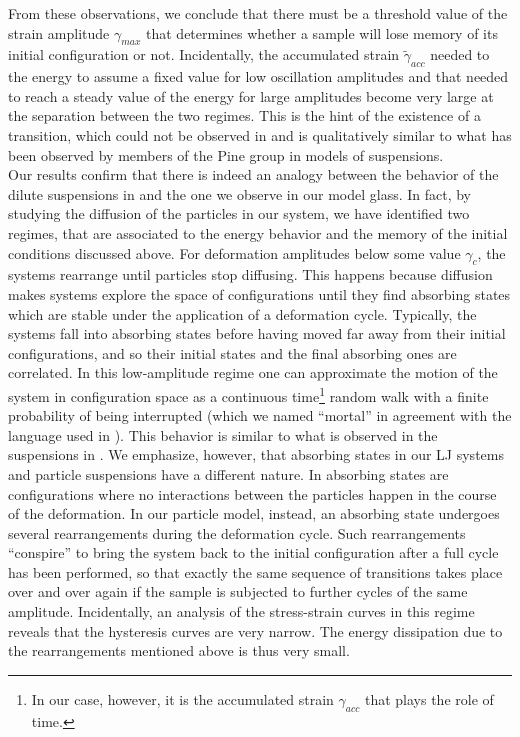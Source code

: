 From these observations, we conclude that there must be a threshold value of the strain amplitude $\gamma_{max}$ that determines whether a sample will lose memory of its initial configuration or not.
Incidentally, the accumulated strain $\widetilde{\gamma}_{acc}$ needed to the energy to assume a fixed value for low oscillation amplitudes and that needed to reach a steady value of the energy for large amplitudes become very large at the separation between the two regimes. 
This is the hint of the existence of a transition, which could not be observed in \cite{lacks2004energy} and is qualitatively similar to what has been observed by members of the Pine group \cite{corte2008random} in models of suspensions.\\
Our results confirm that there is indeed an analogy between the behavior of the dilute suspensions in \cite{corte2008random} and the one we observe in our model glass. In fact, by studying the diffusion of the particles in our system, we have identified two regimes, that are associated to the energy behavior and the memory of the initial conditions discussed above. For deformation amplitudes below some value $\gamma_{c}$, the systems rearrange until particles stop diffusing. This happens because diffusion makes systems explore the space of configurations until they find absorbing states which are stable under the application of a deformation cycle. Typically, the systems fall into absorbing states before having moved far away from their initial configurations, and so their initial states and the final absorbing ones are correlated.
In this low-amplitude regime one can approximate the motion of the system in configuration space as a continuous time\footnote{In our case, however, it is the accumulated strain $\gamma_{acc}$ that plays the role of time.} random walk with a finite probability of being interrupted (which we named ``mortal'' in agreement with the language used in \cite{yuste2013exploration}). This behavior is similar to what is observed in the suspensions in \cite{corte2008random}. We emphasize, however, that absorbing states in our LJ systems and particle suspensions have a different nature. In \cite{corte2008random} absorbing states are configurations where no interactions between the particles happen in the course of the deformation. In our particle model, instead, an absorbing state undergoes several rearrangements during the deformation cycle. Such rearrangements ``conspire'' to bring the system back to the initial configuration after a full cycle has been performed, so that exactly the same sequence of transitions takes place over and over again if the sample is subjected to further cycles of the same amplitude. Incidentally, an analysis of the stress-strain curves in this regime reveals that the hysteresis curves are very narrow. The energy dissipation due to the rearrangements mentioned above is thus very small.\\
